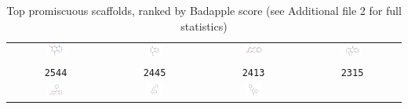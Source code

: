 \begin{table}
\caption{Top promiscuous scaffolds, ranked by Badapple score (see Additional file 2 for full statistics)}
\begin{center}
\begin{tabular}{ |c|c|c|c| } 
\hline
\includegraphics[align=t,width=0.2\textwidth]{data/badapple/Fig2_scaf_01.png} 
& \includegraphics[align=t,width=0.2\textwidth]{data/badapple/Fig2_scaf_02.png}
& \includegraphics[align=t,width=0.2\textwidth]{data/badapple/Fig2_scaf_03.png}
& \includegraphics[align=t,width=0.2\textwidth]{data/badapple/Fig2_scaf_04.png}\\
\texttt{2544} & \texttt{2445} & \texttt{2413} & \texttt{2315}\\
\hline
\includegraphics[align=t,width=0.2\textwidth]{data/badapple/Fig2_scaf_05.png} 
& \includegraphics[align=t,width=0.2\textwidth]{data/badapple/Fig2_scaf_06.png}
& \includegraphics[align=t,width=0.2\textwidth]{data/badapple/Fig2_scaf_07.png}

\end{tabular}
\end{center}
\end{table}
